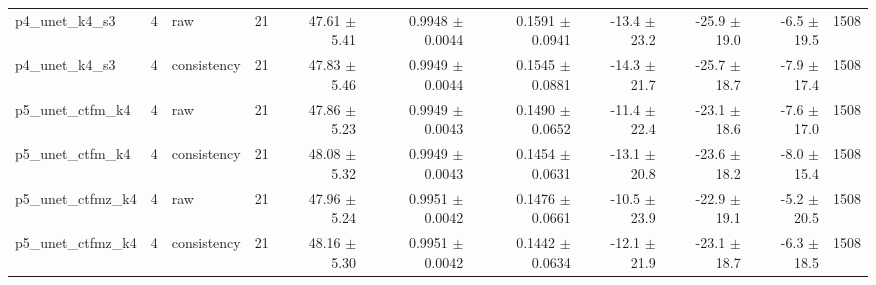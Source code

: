 \begin{tabular}{lllrrrrrrrr}
p4\_unet\_k4\_s3 & 4 & raw & 21 & 47.61 $\pm$ 5.41 & 0.9948 $\pm$ 0.0044 & 0.1591 $\pm$ 0.0941 & -13.4 $\pm$ 23.2 & -25.9 $\pm$ 19.0 & -6.5 $\pm$ 19.5 & 1508 \\
p4\_unet\_k4\_s3 & 4 & consistency & 21 & 47.83 $\pm$ 5.46 & 0.9949 $\pm$ 0.0044 & 0.1545 $\pm$ 0.0881 & -14.3 $\pm$ 21.7 & -25.7 $\pm$ 18.7 & -7.9 $\pm$ 17.4 & 1508 \\
p5\_unet\_ctfm\_k4 & 4 & raw & 21 & 47.86 $\pm$ 5.23 & 0.9949 $\pm$ 0.0043 & 0.1490 $\pm$ 0.0652 & -11.4 $\pm$ 22.4 & -23.1 $\pm$ 18.6 & -7.6 $\pm$ 17.0 & 1508 \\
p5\_unet\_ctfm\_k4 & 4 & consistency & 21 & 48.08 $\pm$ 5.32 & 0.9949 $\pm$ 0.0043 & 0.1454 $\pm$ 0.0631 & -13.1 $\pm$ 20.8 & -23.6 $\pm$ 18.2 & -8.0 $\pm$ 15.4 & 1508 \\
p5\_unet\_ctfmz\_k4 & 4 & raw & 21 & 47.96 $\pm$ 5.24 & 0.9951 $\pm$ 0.0042 & 0.1476 $\pm$ 0.0661 & -10.5 $\pm$ 23.9 & -22.9 $\pm$ 19.1 & -5.2 $\pm$ 20.5 & 1508 \\
p5\_unet\_ctfmz\_k4 & 4 & consistency & 21 & 48.16 $\pm$ 5.30 & 0.9951 $\pm$ 0.0042 & 0.1442 $\pm$ 0.0634 & -12.1 $\pm$ 21.9 & -23.1 $\pm$ 18.7 & -6.3 $\pm$ 18.5 & 1508 \\
\bottomrule
\end{tabular}
